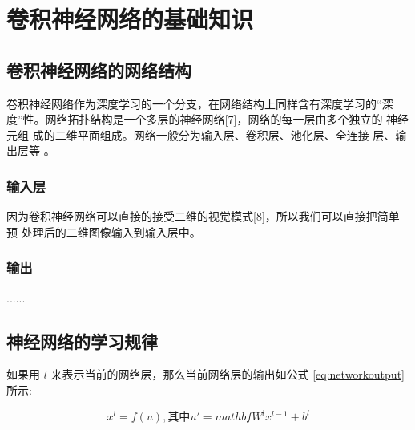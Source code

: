 \chapter{卷积神经网络的基础知识}
\section{卷积神经网络的网络结构}
卷积神经网络作为深度学习的一个分支，在网络结构上同样含有深度学习的“深
度”性。网络拓扑结构是一个多层的神经网络[7]，网络的每一层由多个独立的
神经元组 成的二维平面组成。网络一般分为输入层、卷积层、池化层、全连接
层、输出层等 \cite{tiledsets}。

\subsection{输入层}
因为卷积神经网络可以直接的接受二维的视觉模式[8]，所以我们可以直接把简单预
处理后的二维图像输入到输入层中。

\subsection{输出}
......

\section{神经网络的学习规律}
如果用 $l$ 来表示当前的网络层，那么当前网络层的输出如公式 \ref{eq:networkoutput} 所示:

\begin{equation}
  \label{eq:networkoutput}
  x^l=f(u), \text{其中} u'=mathbf{W}^l x^{l-1}+b^l
\end{equation}